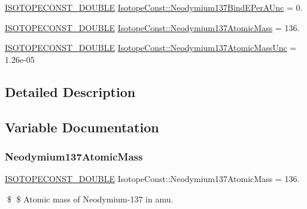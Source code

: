 \begin{DoxyCompactItemize}
\mbox{\hyperlink{group___isotope_const-_macros_ga8f45a7272ce02c0b4c65c44636ed719a}{I\+S\+O\+T\+O\+P\+E\+C\+O\+N\+S\+T\+\_\+\+D\+O\+U\+B\+LE}} \mbox{\hyperlink{group___isotope_const-_neodymium-_nd137_ga958802941b7a03606c2727c97d9eae0d}{Isotope\+Const\+::\+Neodymium137\+Bind\+E\+Per\+A\+Unc}} = 0.
\item 
\mbox{\hyperlink{group___isotope_const-_macros_ga8f45a7272ce02c0b4c65c44636ed719a}{I\+S\+O\+T\+O\+P\+E\+C\+O\+N\+S\+T\+\_\+\+D\+O\+U\+B\+LE}} \mbox{\hyperlink{group___isotope_const-_neodymium-_nd137_ga5588720208f81426f8f6976630ce98b1}{Isotope\+Const\+::\+Neodymium137\+Atomic\+Mass}} = 136.
\item 
\mbox{\hyperlink{group___isotope_const-_macros_ga8f45a7272ce02c0b4c65c44636ed719a}{I\+S\+O\+T\+O\+P\+E\+C\+O\+N\+S\+T\+\_\+\+D\+O\+U\+B\+LE}} \mbox{\hyperlink{group___isotope_const-_neodymium-_nd137_gac0e124926088680a26ff655ffc455b81}{Isotope\+Const\+::\+Neodymium137\+Atomic\+Mass\+Unc}} = 1.\+26e-\/05
\end{DoxyCompactItemize}


\subsection{Detailed Description}


\subsection{Variable Documentation}
\mbox{\label{group___isotope_const-_neodymium-_nd137_ga5588720208f81426f8f6976630ce98b1}} 
\subsubsection{\texorpdfstring{Neodymium137\+Atomic\+Mass}{Neodymium137AtomicMass}}
{\footnotesize\ttfamily \mbox{\hyperlink{group___isotope_const-_macros_ga8f45a7272ce02c0b4c65c44636ed719a}{I\+S\+O\+T\+O\+P\+E\+C\+O\+N\+S\+T\+\_\+\+D\+O\+U\+B\+LE}} Isotope\+Const\+::\+Neodymium137\+Atomic\+Mass = 136.}

\$ \$ Atomic mass of Neodymium-\/137 in amu. \mbox{\label{group___isotope_const-_neodymium-_nd137_gac0e124926088680a26ff655ffc455b81}} 
